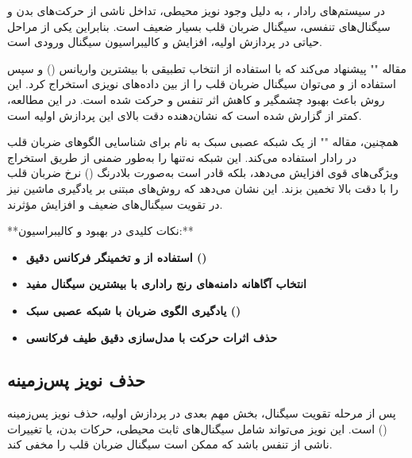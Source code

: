 در سیستم‌های رادار ، به دلیل وجود نویز محیطی، تداخل ناشی از حرکت‌های بدن و سیگنال‌های تنفسی، سیگنال ضربان قلب بسیار ضعیف است. بنابراین یکی از مراحل حیاتی در پردازش اولیه، افزایش  و کالیبراسیون سیگنال ورودی است.

مقاله "" پیشنهاد می‌کند که با استفاده از انتخاب تطبیقی  با بیشترین واریانس () و سپس استفاده از  و  می‌توان سیگنال ضربان قلب را از بین داده‌های نویزی استخراج کرد. این روش باعث بهبود چشمگیر  و کاهش اثر تنفس و حرکت شده است. در این مطالعه،  کمتر از  گزارش شده است که نشان‌دهنده دقت بالای این پردازش اولیه است.

همچنین، مقاله "" از یک شبکه عصبی سبک به نام  برای شناسایی الگوهای ضربان قلب در  رادار استفاده می‌کند. این شبکه نه‌تنها  را به‌طور ضمنی از طریق استخراج ویژگی‌های قوی افزایش می‌دهد، بلکه قادر است به‌صورت بلادرنگ () نرخ ضربان قلب را با دقت بالا تخمین بزند. این نشان می‌دهد که روش‌های مبتنی بر یادگیری ماشین نیز در تقویت سیگنال‌های ضعیف و افزایش  مؤثرند.

**نکات کلیدی در بهبود  و کالیبراسیون:**
\begin{itemize}
    \item \textbf{استفاده از  و تخمینگر فرکانس دقیق ()}
    \item \textbf{انتخاب آگاهانه دامنه‌های رنج راداری با بیشترین سیگنال مفید}
    \item \textbf{یادگیری الگوی ضربان با شبکه عصبی سبک ()}
    \item \textbf{حذف اثرات حرکت با مدل‌سازی دقیق طیف فرکانسی}
\end{itemize}

\subsection{حذف نویز پس‌زمینه} %
\label{sec:background-noise-removal}

پس از مرحله تقویت سیگنال، بخش مهم بعدی در پردازش اولیه، حذف نویز پس‌زمینه () است. این نویز می‌تواند شامل سیگنال‌های ثابت محیطی، حرکات بدن، یا تغییرات ناشی از تنفس باشد که ممکن است سیگنال ضربان قلب را مخفی کند.

